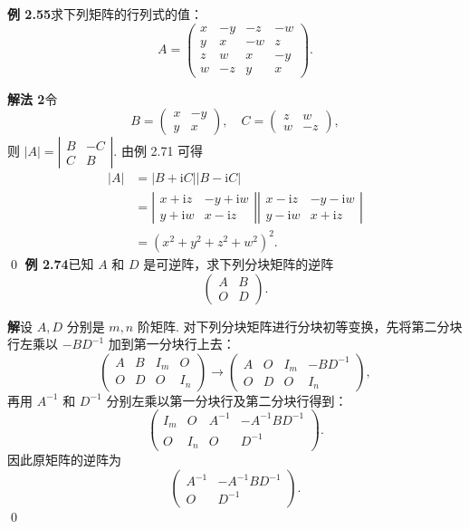 \documentclass[UTF8, 12pt, fontset=fandol, oneside]{ctexart}
\begin{document}
\noindent\textbf{例 2.55}\quad 求下列矩阵的行列式的值：
\[
A=
\left(
\begin{array}{rrrr}
x & -y & -z & -w\\
y & x & -w & z\\
z & w & x & -y\\
w & -z & y & x
\end{array}
\right).
\]

\noindent\textbf{解法 2}\quad 令
\[
B=
\left(
\begin{array}{rr}
x & -y\\
y & x
\end{array}
\right),\quad
C=
\left(
\begin{array}{rr}
z & w\\
w & -z
\end{array}
\right),
\]
则 $|A|=
\left|
\begin{array}{cc}
B & -C\\
C & B
\end{array}
\right|$. 由例 2.71 可得
\[
\begin{aligned}
|A|
&=|B+\mathrm iC||B-\mathrm iC|\\
&=
\left|
\begin{array}{cc}
x+\mathrm iz & -y+\mathrm iw\\
y+\mathrm iw & x-\mathrm iz
\end{array}
\right|
\left|
\begin{array}{cc}
x-\mathrm iz & -y-\mathrm iw\\
y-\mathrm iw & x+\mathrm iz
\end{array}
\right|\\
&=(x^2+y^2+z^2+w^2)^2.
\end{aligned}
\]
\qed
\noindent\textbf{例 2.74}\quad 已知 $A$ 和 $D$ 是可逆阵，求下列分块矩阵的逆阵
\[
\left(
\begin{array}{cc}
A & B\\
O & D
\end{array}
\right).
\]

\noindent\textbf{解}\quad 设 $A,D$ 分别是 $m,n$ 阶矩阵. 对下列分块矩阵进行分块初等变换，先将第二分块行左乘以 $-BD^{-1}$ 加到第一分块行上去：
\[
\left(
\begin{array}{cc|cc}
A & B & I_m & O\\
O & D & O & I_n
\end{array}
\right)
\to
\left(
\begin{array}{cc|cc}
A & O & I_m & -BD^{-1}\\
O & D & O & I_n
\end{array}
\right),
\]
再用 $A^{-1}$ 和 $D^{-1}$ 分别左乘以第一分块行及第二分块行得到：
\[
\left(
\begin{array}{cc|cc}
I_m & O & A^{-1} & -A^{-1}BD^{-1}\\
O & I_n & O & D^{-1}
\end{array}
\right).
\]
因此原矩阵的逆阵为
\[
\left(
\begin{array}{cc}
A^{-1} & -A^{-1}BD^{-1}\\
O & D^{-1}
\end{array}
\right).
\]
\qed
\end{document}
